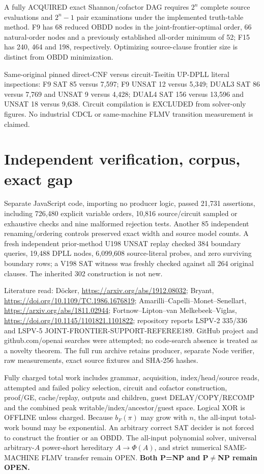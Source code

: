 \documentclass[11pt]{article}
\begin{document}
A fully ACQUIRED exact Shannon/cofactor DAG requires \(2^n\) complete source evaluations and \(2^n-1\) pair examinations under the implemented truth-table method. F9 has 68 reduced OBDD nodes in the joint-frontier-optimal order, 66 natural-order nodes and a previously established all-order minimum of 52; F15 has 240, 464 and 198, respectively. Optimizing source-clause frontier size is distinct from OBDD minimization.

Same-original pinned direct-CNF versus circuit-Tseitin UP-DPLL literal inspections: F9 SAT 85 versus 7,597; F9 UNSAT 12 versus 5,349; DUAL3 SAT 86 versus 7,769 and UNSAT 9 versus 4,428; DUAL4 SAT 156 versus 13,596 and UNSAT 18 versus 9,638. Circuit compilation is EXCLUDED from solver-only figures. No industrial CDCL or same-machine FLMV transition measurement is claimed.

\section*{Independent verification, corpus, exact gap}
Separate JavaScript code, importing no producer logic, passed 21,731 assertions, including 726,480 explicit variable orders, 10,816 source/circuit sampled or exhaustive checks and nine malformed rejection tests. Another 85 independent renaming/ordering controls preserved exact width and source model counts. A fresh independent prior-method U198 UNSAT replay checked 384 boundary queries, 19,488 DPLL nodes, 6,099,608 source-literal probes, and zero surviving boundary rows; a V198 SAT witness was freshly checked against all 264 original clauses. The inherited 302 construction is not new.

Literature read: D\"ocker, \url{https://arxiv.org/abs/1912.08032}; Bryant, \url{https://doi.org/10.1109/TC.1986.1676819}; Amarilli--Capelli--Monet--Senellart, \url{https://arxiv.org/abs/1811.02944}; Fortnow--Lipton--van Melkebeek--Viglas, \url{https://doi.org/10.1145/1101821.1101822}; repository reports LSPV-2 335/336 and LSPV-5 JOINT-FRONTIER-SUPPORT-REFEREE189. GitHub project and github.com/openai searches were attempted; no code-search absence is treated as a novelty theorem. The full run archive retains producer, separate Node verifier, raw measurements, exact source fixtures and SHA-256 hashes.

Fully charged total work includes grammar, acquisition, index/head/source reads, attempted and failed policy selection, circuit and cofactor construction, proof/GE, cache/replay, outputs and children, guest DELAY/COPY/RECOMP and the combined peak writable/index/ancestor/guest space. Logical XOR is OFFLINE unless charged. Because \(b_F(\pi)\) may grow with \(n\), the all-input total-work bound may be exponential. An arbitrary correct SAT decider is not forced to construct the frontier or an OBDD. The all-input polynomial solver, universal arbitrary-\(A\) power-short hereditary \(A\to\Phi(A)\), and strict numerical SAME-MACHINE FLMV transfer remain OPEN. \textbf{Both P=NP and P\(\ne\)NP remain OPEN.}
\end{document}
